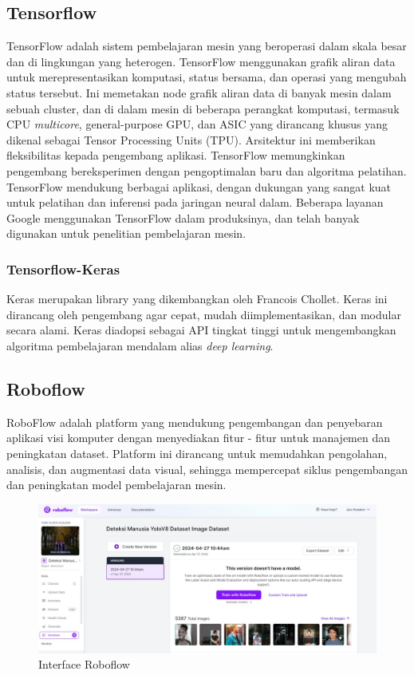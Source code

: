 \subsection{Tensorflow}
TensorFlow adalah sistem pembelajaran mesin yang beroperasi dalam skala besar dan di lingkungan yang heterogen\cite{geron2022hands}. TensorFlow menggunakan grafik aliran data untuk merepresentasikan komputasi, status bersama, dan operasi yang mengubah status tersebut. Ini memetakan node grafik aliran data di banyak mesin dalam sebuah cluster, dan di dalam mesin di beberapa perangkat komputasi, termasuk CPU \emph{multicore}, general-purpose GPU, dan ASIC yang dirancang khusus yang dikenal sebagai Tensor Processing Units (TPU). Arsitektur ini memberikan fleksibilitas kepada pengembang aplikasi. TensorFlow memungkinkan pengembang bereksperimen dengan pengoptimalan baru dan algoritma pelatihan. TensorFlow mendukung berbagai aplikasi, dengan dukungan yang sangat kuat untuk pelatihan dan inferensi pada jaringan neural dalam. Beberapa layanan Google menggunakan TensorFlow dalam produksinya, dan telah banyak digunakan untuk penelitian pembelajaran mesin.

\subsubsection{Tensorflow-Keras}
Keras merupakan library yang dikembangkan oleh Francois Chollet. Keras ini dirancang oleh pengembang agar cepat, mudah diimplementasikan, dan modular secara alami. Keras diadopsi sebagai API tingkat tinggi untuk mengembangkan algoritma pembelajaran mendalam alias \emph{deep learning}\cite{geron2022hands}. 

\subsection{Roboflow}
RoboFlow adalah platform yang mendukung pengembangan dan penyebaran aplikasi visi komputer dengan menyediakan fitur - fitur untuk manajemen dan peningkatan dataset. Platform ini dirancang untuk memudahkan pengolahan, analisis, dan augmentasi data visual, sehingga mempercepat siklus pengembangan dan peningkatan model pembelajaran mesin.

\begin{figure}[H]
  \centering

  \includegraphics[scale=0.3]{gambar/roboflow.jpg}

  \caption{Interface Roboflow}
  \label{fig:roboflow}
\end{figure}

